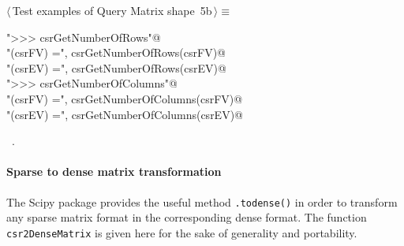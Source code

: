 \documentclass[11pt,oneside]{article}    %
\begin{document}
\begin{flushleft} \small \label{scrap9}
\protect{}$\langle\,$Test examples of Query Matrix shape\nobreak\ {\footnotesize 5b}$\,\rangle\equiv$
\vspace{-1ex}
\begin{list}{}{} \item
\mbox{}\verb@print "\n>>> csrGetNumberOfRows"@\\
\mbox{}\verb@print "\ncsrGetNumberOfRows(csrFV) =", csrGetNumberOfRows(csrFV)@\\
\mbox{}\verb@print "\ncsrGetNumberOfRows(csrEV) =", csrGetNumberOfRows(csrEV)@\\
\mbox{}\verb@print "\n>>> csrGetNumberOfColumns"@\\
\mbox{}\verb@print "\ncsrGetNumberOfColumns(csrFV) =", csrGetNumberOfColumns(csrFV)@\\
\mbox{}\verb@print "\ncsrGetNumberOfColumns(csrEV) =", csrGetNumberOfColumns(csrEV)@\\
\mbox{}\verb@@{\NWsep}
\end{list}
\vspace{-1ex}
\footnotesize\addtolength{\baselineskip}{-1ex}
\begin{list}{}{\setlength{\itemsep}{-\parsep}\setlength{\itemindent}{-\leftmargin}}
\item \NWtxtMacroRefIn\ .
\end{list}
\end{flushleft}

\paragraph{Sparse to dense matrix transformation}
The Scipy package provides the useful method \texttt{.todense()} in order to transform any sparse matrix format in the corresponding dense format. The function \texttt{csr2DenseMatrix} is given here for the sake of generality and portability.
\end{document}
